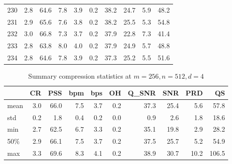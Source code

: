 \begin{table}[ht]
\begin{tabular}{rrrrrrrrrr}
    230 & 2.8 & 64.6 &  7.8 &  3.9 & 0.2 &   38.2 & 24.7 &  5.9 &  48.2 \\
    231 & 2.9 & 65.6 &  7.6 &  3.8 & 0.2 &   38.2 & 25.5 &  5.3 &  54.8 \\
    232 & 3.0 & 66.8 &  7.3 &  3.7 & 0.2 &   37.9 & 22.8 &  7.3 &  41.4 \\
    233 & 2.8 & 63.8 &  8.0 &  4.0 & 0.2 &   37.9 & 24.9 &  5.7 &  48.8 \\
    234 & 2.8 & 64.6 &  7.8 &  3.9 & 0.2 &   37.3 & 25.2 &  5.5 &  51.6 \\
\bottomrule
\end{tabular}
\label{tbl:comp:stats:m=256:n=512:d=4}
\end{table}

\begin{table}[ht]
\tiny
\centering
\caption{Summary compression statistics at $m=256,n=512,d=4$}
\begin{tabular}{lrrrrrrrrr}
\toprule
{} &  CR &  PSS &  bpm &  bps &  OH &  Q\_SNR &  SNR &  PRD &    QS \\
\midrule
mean & 3.0 & 66.0 &  7.5 &  3.7 & 0.2 &   37.3 & 25.4 &  5.6 &  57.8 \\
std  & 0.2 &  1.8 &  0.4 &  0.2 & 0.0 &    0.9 &  2.6 &  1.8 &  18.6 \\
min  & 2.7 & 62.5 &  6.7 &  3.3 & 0.2 &   35.1 & 19.8 &  2.9 &  28.2 \\
50\%  & 2.9 & 66.1 &  7.5 &  3.7 & 0.2 &   37.5 & 25.7 &  5.2 &  54.9 \\
max  & 3.3 & 69.6 &  8.3 &  4.1 & 0.2 &   38.9 & 30.7 & 10.2 & 106.5 \\
\bottomrule
\end{tabular}
\label{tbl:comp:summary:m=256:n=512:d=4}
\end{table}
